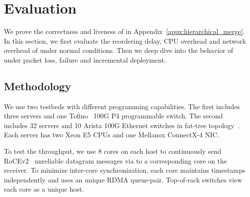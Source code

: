 \section{Evaluation}
\label{sec:evaluation}


We prove the correctness and liveness of \sys in Appendix~\ref{appx:hierarchical_merge}.
In this section, we first evaluate the reordering delay, CPU overhead and network overhead of \sys under normal conditions. Then we deep dive into the behavior of \sys under packet loss, failure and incremental deployment.

\subsection{Methodology}
\label{sec:testbed}

We use two testbeds with different programming capabilities. The first  includes three servers and one Tofino~\cite{tofino} 100G P4 programmable switch. The second includes 32 servers and 10 Arista 100G Ethernet switches in fat-tree topology~\cite{arista}. Each server has two Xeon E5 CPUs and one Mellanox ConnectX-4 NIC.


To test the throughput, we use 8 cores on each host to continuously send RoCEv2~\cite{infinibandrocev2} unreliable datagram messages via \sys to a corresponding core on the receiver. To minimize inter-core synchronization, each core maintains timestamps independently and uses an unique RDMA queue-pair. Top-of-rack switches view each core as a unique host.

